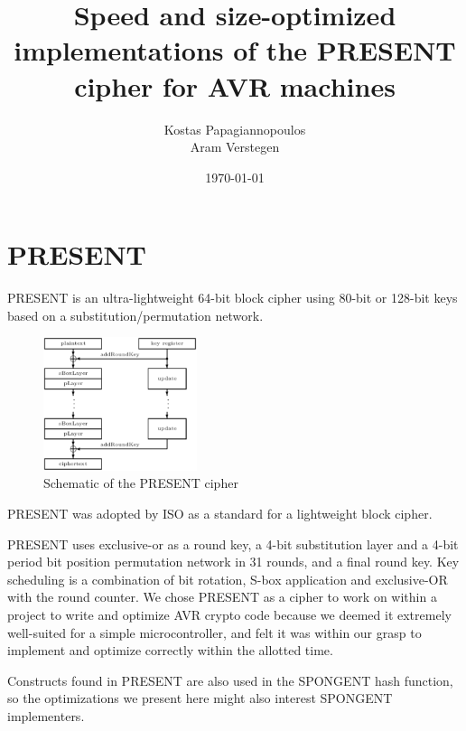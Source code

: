 \documentclass{llncs}
\begin{document}
\title{Speed and size-optimized implementations of the PRESENT cipher for AVR machines}
\author{
Kostas Papagiannopoulos \\
Aram Verstegen
}
\date{\today}

\maketitle


\section{PRESENT}
PRESENT \cite{bogdanov2007present} is an ultra-lightweight 64-bit block cipher using 80-bit or 128-bit keys based on a substitution/permutation network.
\begin{figure}
	\label{present_schematic}
	\caption{Schematic of the PRESENT cipher}
	\centering \includegraphics[width=0.4\textwidth]{present.eps}
\end{figure}


PRESENT was adopted by ISO as a standard for a lightweight block cipher. \cite{present_iso}

PRESENT uses exclusive-or as a round key, a 4-bit substitution layer and a 4-bit period bit position permutation network in 31 rounds, and a final round key.
Key scheduling is a combination of bit rotation, S-box application and exclusive-OR with the round counter.
We chose PRESENT as a cipher to work on within a project to write and optimize AVR crypto code because we deemed it extremely well-suited for a simple microcontroller, and felt it was within our grasp to implement and optimize correctly within the allotted time.

Constructs found in PRESENT are also used in the SPONGENT \cite{bogdanov2011spongent} hash function, so the optimizations we present here might also interest SPONGENT implementers.
\end{document}
